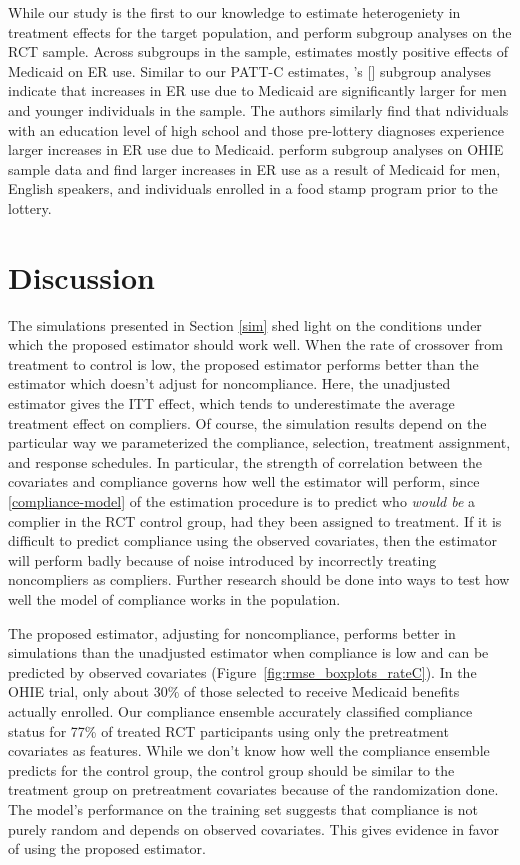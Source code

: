 \documentclass[hidelinks,12pt]{article}
\newcommand{\possessivecite}[1]{\citeauthor{#1}'s [\citeyear{#1}]}
\begin{document}
{While our study is the first to our knowledge to estimate heterogeniety in treatment effects for the target population, \citet{Taubman} and \citet{NBERw22363} perform subgroup analyses on the RCT sample. Across subgroups in the sample, \citet{Taubman} estimates mostly positive effects of Medicaid on ER use. Similar to our PATT-C estimates, \possessivecite{Taubman} subgroup analyses indicate that increases in ER use due to Medicaid are significantly larger for men and younger individuals in the sample. The authors similarly find that ndividuals with an education level of high school and those pre-lottery diagnoses experience larger increases in ER use due to Medicaid. \citet{NBERw22363} perform subgroup analyses on OHIE sample data and find larger increases in ER use as a result of Medicaid for men, English speakers, and individuals enrolled in a food stamp program prior to the lottery. 

\section{Discussion} \label{discussion}

The simulations presented in Section \ref{sim} shed light on the conditions under which the proposed estimator should work well. When the rate of crossover from treatment to control is low, the proposed estimator performs better than the estimator which doesn't adjust for noncompliance. Here, the unadjusted estimator gives the ITT effect, which tends to underestimate the average treatment effect on compliers. Of course, the simulation results depend on the particular way we parameterized the compliance, selection, treatment assignment, and response schedules. In particular, the strength of correlation between the covariates and compliance governs how well the estimator will perform, since \ref{compliance-model} of the estimation procedure is to predict who \textit{would be} a complier in the RCT control group, had they been assigned to treatment. If it is difficult to predict compliance using the observed covariates, then the estimator will perform badly because of noise introduced by incorrectly treating noncompliers as compliers. Further research should be done into ways to test how well the model of compliance works in the population. 

The proposed estimator, adjusting for noncompliance, performs better in simulations than the unadjusted estimator when compliance is low and can be predicted by observed covariates (Figure~\ref{fig:rmse_boxplots_rateC}). In the OHIE trial, only about $30\%$ of those selected to receive Medicaid benefits actually enrolled. Our compliance ensemble accurately classified compliance status for 77\% of treated RCT participants using only the pretreatment covariates as features. While we don't know how well the compliance ensemble predicts for the control group, the control group should be similar to the treatment group on pretreatment covariates because of the randomization done. The model's performance on the training set suggests that compliance is not purely random and depends on observed covariates. This gives evidence in favor of using the proposed estimator. 

}
\end{document}
